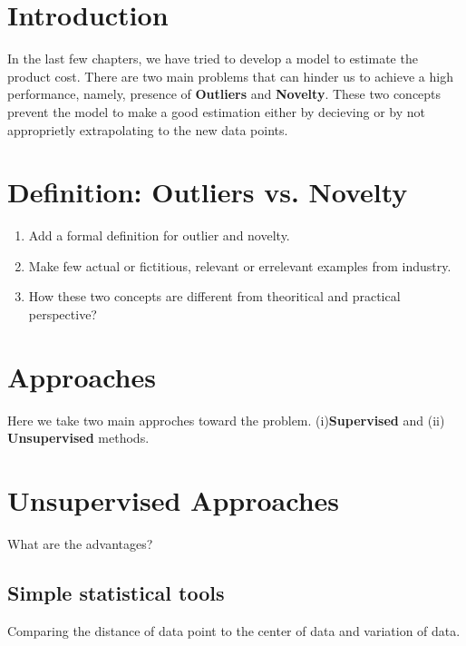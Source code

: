 \documentclass{article}
\begin{document}
\section{Introduction}

In the last few chapters, we have tried to develop a model to estimate the product cost. There are two main problems that can hinder us to achieve a high performance, namely, presence of {\bf Outliers} and {\bf Novelty}. These two concepts prevent the model to make a good estimation either by decieving or by not approprietly extrapolating to the new data points.

\section{Definition: Outliers vs. Novelty}

\begin{enumerate}
\item Add a formal definition for outlier and novelty.
\item Make few actual or fictitious, relevant or errelevant examples from industry.
\item How these two concepts are different from theoritical and practical perspective?
  
\end{enumerate}

\section{Approaches}
Here we take two main approches toward the problem. (i){\bf Supervised} and (ii) {\bf Unsupervised} methods.


\section{Unsupervised Approaches}
What are the advantages?

\subsection{Simple statistical tools}

Comparing the distance of data point to the center of data and variation of data.

\subsection{}
\end{document}
